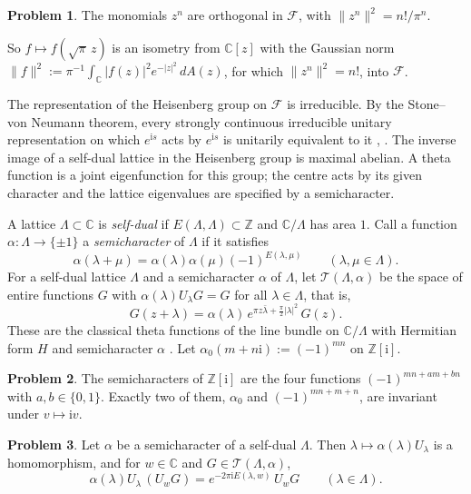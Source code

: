 \documentclass[reqno]{amsart}
\theoremstyle{definition}
\newtheorem{problem}{Problem}[section]
\theoremstyle{plain}
\newcommand{\Z}{\mathbb{Z}}
\newcommand{\C}{\mathbb{C}}
\newcommand{\ii}{\mathrm{i}}
\newcommand{\Fc}{\mathcal{F}}
\begin{document}
\begin{problem}\label{pr:monomials}
The monomials \(z^n\) are orthogonal in \(\Fc\), with \(\lVert z^n\rVert^2 = n!/\pi^n\).
\end{problem}

So \(f \mapsto f(\sqrt\pi\, z)\) is an isometry from \(\C[z]\) with the Gaussian norm \(\lVert f\rVert^2 := \pi^{-1}\int_\C \lvert f(z)\rvert^2 e^{-\lvert z\rvert^2}\,dA(z)\), for which \(\lVert z^n\rVert^2 = n!\), into \(\Fc\).

The representation of the Heisenberg group on \(\Fc\) is irreducible.  By the Stone--von Neumann theorem, every strongly continuous irreducible unitary representation on which \(e^{\ii s}\) acts by \(e^{\ii s}\) is unitarily equivalent to it \cite{LV}, \cite[Ch.~2]{Pol}.  The inverse image of a self-dual lattice in the Heisenberg group is maximal abelian.  A theta function is a joint eigenfunction for this group; the centre acts by its given character and the lattice eigenvalues are specified by a semicharacter.

A lattice \(\Lambda \subset \C\) is \emph{self-dual} if \(E(\Lambda,\Lambda) \subset \Z\) and \(\C/\Lambda\) has area \(1\).  Call a function \(\alpha \colon \Lambda \to \{\pm1\}\) a \emph{semicharacter} of \(\Lambda\) if it satisfies
\[
  \alpha(\lambda + \mu) = \alpha(\lambda)\alpha(\mu)(-1)^{E(\lambda,\mu)} \qquad (\lambda, \mu \in \Lambda) .
\]
For a self-dual lattice \(\Lambda\) and a semicharacter \(\alpha\) of \(\Lambda\), let \(\mathcal{T}(\Lambda,\alpha)\) be the space of entire functions \(G\) with \(\alpha(\lambda)U_\lambda G = G\) for all \(\lambda \in \Lambda\), that is,
\[
  G(z + \lambda) = \alpha(\lambda)\, e^{\pi z\bar\lambda + \frac\pi2\lvert\lambda\rvert^2}\, G(z) .
\]
These are the classical theta functions of the line bundle on \(\C/\Lambda\) with Hermitian form \(H\) and semicharacter \(\alpha\) \cite[Ch.~1]{Pol}.  Let \(\alpha_0(m + n\ii) := (-1)^{mn}\) on \(\Z[\ii]\).

\begin{problem}\label{pr:semichar}
The semicharacters of \(\Z[\ii]\) are the four functions \((-1)^{mn + am + bn}\) with \(a, b \in \{0,1\}\).  Exactly two of them, \(\alpha_0\) and \((-1)^{mn+m+n}\), are invariant under \(v \mapsto \ii v\).
\end{problem}

\begin{problem}\label{pr:eigen}
Let \(\alpha\) be a semicharacter of a self-dual \(\Lambda\).  Then \(\lambda \mapsto \alpha(\lambda)U_\lambda\) is a homomorphism, and for \(w \in \C\) and \(G \in \mathcal{T}(\Lambda,\alpha)\),
\[
  \alpha(\lambda)U_\lambda\,(U_w G) = e^{-2\pi\ii E(\lambda,w)}\, U_w G \qquad (\lambda \in \Lambda) .
\]
\end{problem}
\end{document}
